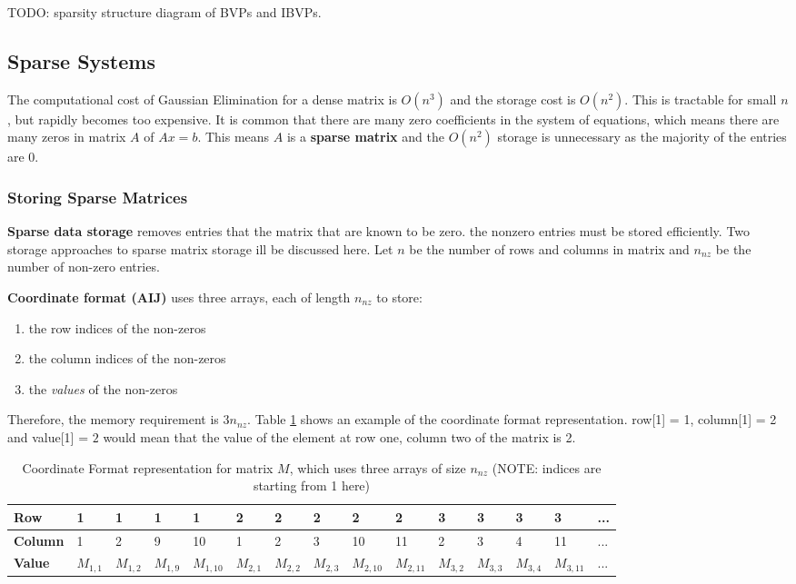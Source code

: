 \documentclass{article}
\begin{document}
TODO: sparsity structure diagram of BVPs and IBVPs.

\subsection{Sparse Systems}

The computational cost of Gaussian Elimination for a dense matrix is $O(n^3)$ and the storage cost is $O(n^2)$. This is tractable for small $n$, but rapidly becomes too expensive. It is common that there are many zero coefficients in the system of equations, which means there are many zeros in matrix $A$ of $Ax = b$. This means $A$ is a \textbf{sparse matrix} and the $O(n^2)$ storage is unnecessary as the majority of the entries are 0.

\subsubsection{Storing Sparse Matrices}

\textbf{Sparse data storage} removes entries that the matrix that are known to be zero. the nonzero entries must be stored efficiently. Two storage approaches to sparse matrix storage ill be discussed here. Let $n$ be the number of rows and columns in matrix and $n_{nz}$ be the number of non-zero entries.

\textbf{Coordinate format (AIJ)} uses three arrays, each of length $n_{nz}$ to store:
\begin{enumerate}
	\item the row indices of the non-zeros
	\item the column indices of the non-zeros
	\item the \textit{values} of the non-zeros
\end{enumerate}
Therefore, the memory requirement is $3n_{nz}$. Table \ref{tab:coordinate-format} shows an example of the coordinate format representation. row[1] = 1, column[1] = 2 and value[1] = $2$ would mean that the value of the element at row one, column two of the matrix is 2.

\begin{table}
	\centering
	\begin{tabular}{|l|llllllllllllll|}
		\hline
		\textbf{Row} & 1 & 1 & 1 & 1 & 2 & 2 & 2 & 2 & 2 & 3 & 3 & 3 & 3 & ... \\
		\hline
		\textbf{Column} & 1 & 2 & 9 & 10 & 1 & 2 & 3 & 10 & 11 & 2 & 3 & 4 & 11 & ... \\
		\hline
		\textbf{Value} & $M_{1,1}$ & $M_{1,2}$ & $M_{1,9}$ & $M_{1,10}$ & $M_{2,1}$ & $M_{2,2}$ & $M_{2,3}$ & $M_{2,10}$ & $M_{2,11}$ & $M_{3,2}$ & $M_{3,3}$ & $M_{3,4}$ & $M_{3,11}$ & ... \\
		\hline
	\end{tabular}
	\caption{Coordinate Format representation for matrix $M$, which uses three arrays of size $n_{nz}$ (NOTE: indices are starting from 1 here)}
	\label{tab:coordinate-format}
\end{table}
\end{document}
